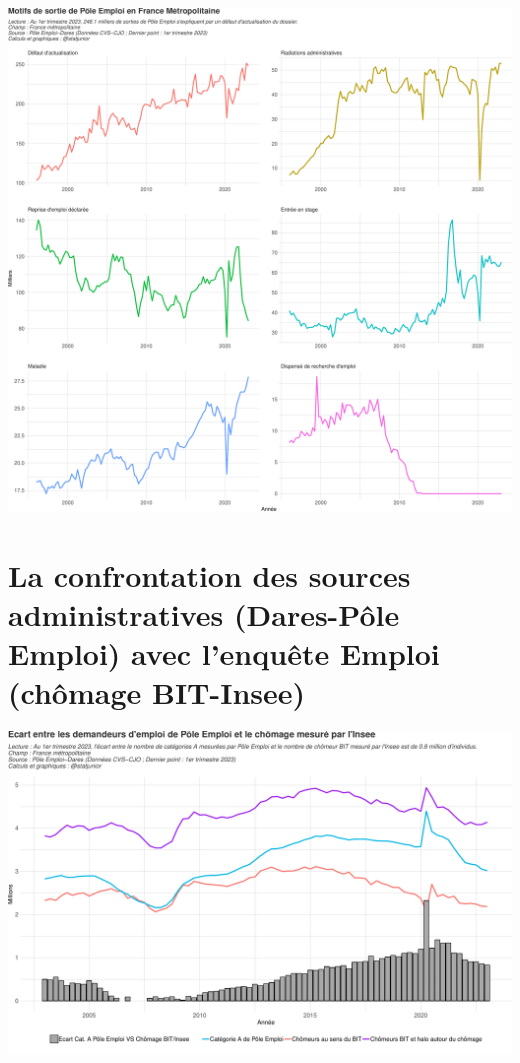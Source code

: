 \documentclass[
  paper=a4,
  ,captions=tableheading
]{scrartcl}
\begin{document}
\includegraphics{rapport_pdf_demandeurs_emploi_pole_emploi_files/figure-latex/unnamed-chunk-17-1.pdf}

\hypertarget{la-confrontation-des-sources-administratives-dares-puxf4le-emploi-avec-lenquuxeate-emploi-chuxf4mage-bit-insee}{%
\section{La confrontation des sources administratives (Dares-Pôle
Emploi) avec l'enquête Emploi (chômage
BIT-Insee)}\label{la-confrontation-des-sources-administratives-dares-puxf4le-emploi-avec-lenquuxeate-emploi-chuxf4mage-bit-insee}}

\includegraphics{rapport_pdf_demandeurs_emploi_pole_emploi_files/figure-latex/unnamed-chunk-19-1.pdf}
\end{document}
